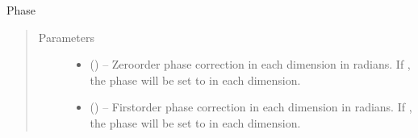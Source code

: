 \documentclass[letterpaper,10pt,english]{sphinxmanual}
\begin{document}
\begin{fulllineitems}
\begin{fulllineitems}
\label{\detokenize{references/core:nmrespy.core.Estimator.phase_data}}
\sphinxAtStartPar
Phase 
\begin{quote}\begin{description}
\item[{Parameters}] \leavevmode\begin{itemize}
\item {} 
\sphinxAtStartPar
{} (\sphinxstyleliteralemphasis{\sphinxupquote{{[}}}\sphinxstyleliteralemphasis{\sphinxupquote{{]}}}\sphinxstyleliteralemphasis{\sphinxupquote{, }}\sphinxstyleliteralemphasis{\sphinxupquote{{[}}}\sphinxstyleliteralemphasis{\sphinxupquote{, }}\sphinxstyleliteralemphasis{\sphinxupquote{{]}}}) – Zero\sphinxhyphen{}order phase correction in each dimension in radians.
If , the phase will be set to  in each dimension.

\item {} 
\sphinxAtStartPar
{} (\sphinxstyleliteralemphasis{\sphinxupquote{{[}}}\sphinxstyleliteralemphasis{\sphinxupquote{{]}}}\sphinxstyleliteralemphasis{\sphinxupquote{, }}\sphinxstyleliteralemphasis{\sphinxupquote{{[}}}\sphinxstyleliteralemphasis{\sphinxupquote{, }}\sphinxstyleliteralemphasis{\sphinxupquote{{]}}}) – First\sphinxhyphen{}order phase correction in each dimension in radians.
If , the phase will be set to  in each dimension.

\end{itemize}

\end{description}\end{quote}


\end{fulllineitems}
\end{fulllineitems}
\end{document}
